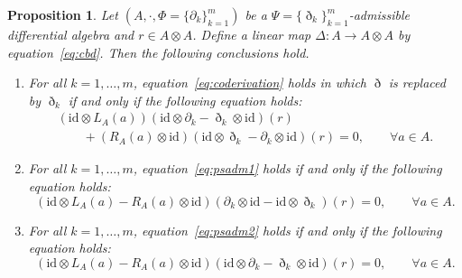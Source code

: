 \documentclass[10pt,a4paper]{amsart}
\numberwithin{equation}{section}
\newtheorem{Proposition}[Theorem]{Proposition}
{ \theoremstyle{definition}
	\newtheorem{Definition}[Theorem]{Definition}
	\newtheorem{Note}[Theorem]{Note}
	\newtheorem{Example}[Theorem]{Example}
	\newtheorem{Remark}[Theorem]{Remark} }
\newcommand{\id}{\mathrm{id}}
\begin{document}
\begin{Proposition}\label{pro:cobAdmeq}
 Let $(A, \cdot, \Phi = \{\partial_k\}_{k=1}^m)$ be a $\Psi = \{\eth_k\}_{k=1}^m$-admissible differential algebra and $r \in A \otimes A$.
 Define a linear map $\Delta\colon A \to A \otimes A$ by equation~\eqref{eq:cbd}.
 Then the following conclusions hold.
 \begin{enumerate}\itemsep=0pt
 \item[$1.$] For all $k=1, \dots, m$, equation~\eqref{eq:coderivation} holds
 in which $\eth$ is replaced by $\eth_k$ if and only if the following equation holds:
 \begin{gather}
 ( \id \otimes L_A(a) )(\id \otimes \partial_k - \eth_k \otimes \id)(r) \nonumber\\
 \qquad{} + (R_A(a)\otimes \id )(\id \otimes \eth_k - \partial_k \otimes \id)(r) = 0, \qquad \forall a \in A. \label{eq:cobdcod}
 \end{gather}
 \item[$2.$] \label{it:2} For all $k=1, \dots, m$, equation~\eqref{eq:psadm1} holds if and only if the following equation holds:
 \begin{equation}
 (\id \otimes L_A(a) - R_A(a) \otimes \id )(\partial_k \otimes \id - \id \otimes \eth_k)(r) = 0, \qquad \forall a \in A. \label{eq:cobpsadm1}
 \end{equation}
 \item[$3.$] \label{it:3} For all $k=1, \dots, m$, equation~\eqref{eq:psadm2} holds if and only if the following equation holds:
 \begin{equation}
 (\id \otimes L_A(a) - R_A(a) \otimes \id )(\id \otimes \partial_k - \eth_k \otimes \id)(r) = 0, \qquad \forall a \in A. \label{eq:cobpsadm2}
 \end{equation}
 \end{enumerate}
\end{Proposition}
\end{document}

